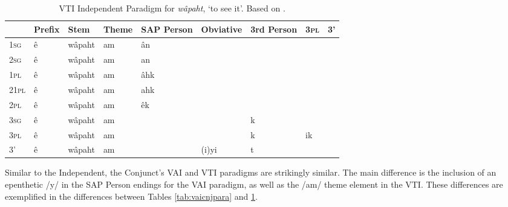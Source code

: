 \begin{table}
  \centering
  \footnotesize
\begin{tabular}{lllllllll}
    \toprule
     & Prefix & Stem   & Theme & SAP Person & Obviative & 3rd Person & 3\textsc{pl} & 3' \\
    \midrule
1\textsc{sg}    & ê      & wâpaht & am    & ân         &           &            &            &    \\
2\textsc{sg}    & ê      & wâpaht & am    & an         &           &            &            &    \\
1\textsc{pl}  & ê      & wâpaht & am    & âhk        &           &            &            &    \\
21\textsc{pl} & ê      & wâpaht & am    & ahk        &           &            &            &    \\
2\textsc{pl}  & ê      & wâpaht & am    & êk         &           &            &            &    \\
3\textsc{sg}    & ê      & wâpaht & am    &            &           & k          &            &    \\
3\textsc{pl}  & ê      & wâpaht & am    &            &           & k          & ik         &    \\
3'   & ê      & wâpaht & am    &            & (i)yi       & t          &            &       \\
    \bottomrule
  \end{tabular}
  \caption{
    VTI Independent Paradigm for \textit{wâpaht}, `to see it'. Based on \citep[417]{Wolvengrey2011}. \label{tab:vticnjpara}
  }
\end{table}

Similar to the Independent, the Conjunct's VAI and VTI paradigms are strikingly similar. The main difference is the inclusion of an epenthetic /y/ in the SAP Person endings for the VAI paradigm, as well as the /am/ theme element in the VTI. These differences are exemplified in the differences between Tables \ref{tab:vaicnjpara} and \ref{tab:vticnjpara}.







